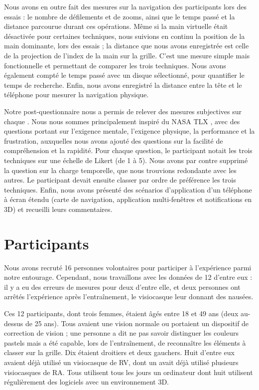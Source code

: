 Nous avons en outre fait des mesures sur la navigation des participants lors des essais : le nombre de défilements et de zooms, ainsi que le temps passé et la distance parcourue durant ces opérations. Même si la main virtuelle était désactivée pour certaines techniques, nous suivions en continu la position de la main dominante, lors des essais ; la distance que nous avons enregistrée est celle de la projection de l'index de la main sur la grille. C'est une mesure simple mais fonctionnelle et permettant de comparer les trois techniques. Nous avons également compté le temps passé avec un disque sélectionné, pour quantifier le temps de recherche. Enfin, nous avons enregistré la distance entre la tête et le téléphone pour mesurer la navigation physique.

Notre post-questionnaire nous a permis de relever des mesures subjectives sur chaque . Nous nous sommes principalement inspiré du NASA TLX \cite{Rubio2004}, avec des questions portant sur l'exigence mentale, l'exigence physique, la performance et la frustration, auxquelles nous avons ajouté des questions sur la facilité de compréhension et la rapidité. Pour chaque question, le participant notait les trois techniques sur une échelle de Likert (de 1 à 5). Nous avons par contre supprimé la question sur la charge temporelle, que nous trouvions redondante avec les autres. Le participant devait ensuite classer par ordre de préférence les trois techniques. Enfin, nous avons présenté des scénarios d'application d'un téléphone à écran étendu (carte de navigation, application multi-fenêtres et notifications en 3D) et recueilli leurs commentaires.


\section{Participants}
\label{sec:experiment_participants}

Nous avons recruté 16 personnes volontaires pour participer à l'expérience parmi notre entourage. Cependant, nous travaillons avec les données de 12 d'entre eux : il y a eu des erreurs de mesures pour deux d'entre elle, et deux personnes ont arrêtés l'expérience après l'entraînement, le visiocasque leur donnant des nausées.

Ces 12 participants, dont trois femmes, étaient âgés entre 18 et 49 ans (deux au-dessus de 25 ans). Tous avaient une vision normale ou portaient un dispositif de correction de vision ; une personne a dit ne pas savoir distinguer les couleurs pastels mais a été capable, lors de l'entraînement, de reconnaître les éléments à classer sur la grille. Dix étaient droitiers et deux gauchers. Huit d'entre eux avaient déjà utilisé un visiocasque de RV, dont un avait déjà utilisé plusieurs visiocasques de RA. Tous utilisent tous les jours un ordinateur dont huit utilisent régulièrement des logiciels avec un environnement 3D.


